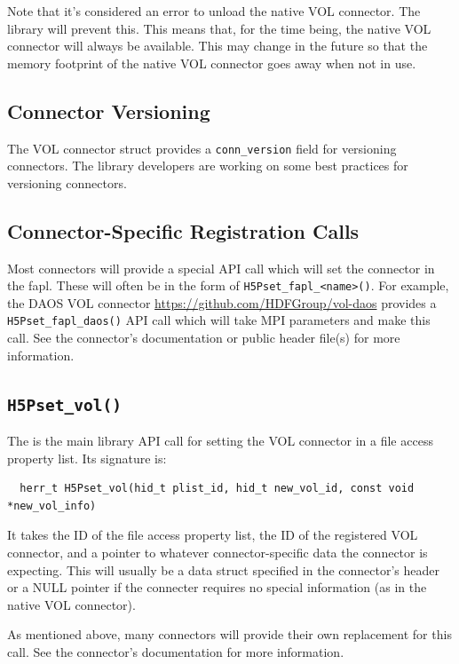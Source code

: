 Note that it's considered an error to unload the native VOL connector. The library will prevent this. This means that, for the time being, the native VOL connector will always be available. This may change in the future so that the memory footprint of the native VOL connector goes away when not in use.

\subsection{Connector Versioning}

The VOL connector struct provides a {\tt conn\_version} field for versioning connectors. The library developers are working on some best practices for versioning connectors.

\subsection{Connector-Specific Registration Calls}

Most connectors will provide a special API call which will set the connector in the fapl. These will often be in the form of {\tt H5Pset\_fapl\_<name>()}. For example, the DAOS VOL connector \url{https://github.com/HDFGroup/vol-daos} provides a {\tt H5Pset\_fapl\_daos()} API call which will take MPI parameters and make this call. See the connector's documentation or public header file(s) for more information.

\subsection{\tt H5Pset\_vol()}

The is the main library API call for setting the VOL connector in a file access property list. Its signature is:

\begin{lstlisting}
  herr_t H5Pset_vol(hid_t plist_id, hid_t new_vol_id, const void *new_vol_info)
\end{lstlisting}

It takes the ID of the file access property list, the ID of the registered VOL connector, and a pointer to whatever connector-specific data the connector is expecting. This will usually be a data struct specified in the connector's header or a NULL pointer if the connecter requires no special information (as in the native VOL connector).

As mentioned above, many connectors will provide their own replacement for this call. See the connector's documentation for more information.


